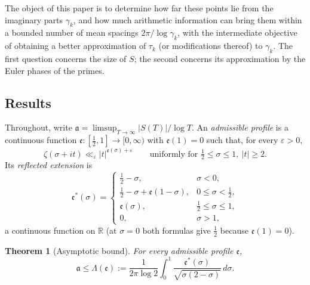 \documentclass[11pt,a4paper]{article}
\numberwithin{equation}{section}
\newtheorem{theorem}{Theorem}[section]
\theoremstyle{definition}
\theoremstyle{remark}
\newcommand{\R}{\mathbb R}
\begin{document}
The object of this paper is to determine how far these points lie from the imaginary parts $\gamma_k$, and how much arithmetic information can bring them within a bounded number of mean spacings $2\pi/\log\gamma_k$, with the intermediate objective of obtaining a better approximation of $\tau_k$ (or modifications thereof) to $\gamma_k$. The first question concerns the size of $S$; the second concerns its approximation by the Euler phases of the primes.

\subsection{Results}\label{subsec:results}
Throughout, write $\mathfrak a=\limsup_{T\to\infty}|S(T)|/\log T$. An \emph{admissible profile} is a continuous function $\mathfrak e:[\frac12,1]\to[0,\infty)$ with $\mathfrak e(1)=0$ such that, for every $\varepsilon>0$,
\begin{equation}
\zeta(\sigma+it)\ll_\varepsilon|t|^{\mathfrak e(\sigma)+\varepsilon}\qquad\text{uniformly for }\tfrac12\le\sigma\le1,\ |t|\ge2 .
\label{eq:admissible}
\end{equation}
Its \emph{reflected extension} is
\begin{equation}
\mathfrak e^*(\sigma)=\begin{cases}\frac12-\sigma,&\sigma<0,\\ \frac12-\sigma+\mathfrak e(1-\sigma),&0\le\sigma<\frac12,\\ \mathfrak e(\sigma),&\frac12\le\sigma\le1,\\ 0,&\sigma>1,\end{cases}
\label{eq:reflected}
\end{equation}
a continuous function on $\R$ (at $\sigma=0$ both formulas give $\frac12$ because $\mathfrak e(1)=0$).

\begin{theorem}[Asymptotic bound]\label{thm:asymptotic}
For every admissible profile $\mathfrak e$,
\begin{equation}
\mathfrak a\le\Lambda(\mathfrak e):=\frac1{2\pi\log2}\int_0^1\frac{\mathfrak e^*(\sigma)}{\sqrt{\sigma(2-\sigma)}}\,d\sigma .
\label{eq:asymptotic_formula}
\end{equation}
\end{theorem}
\end{document}
